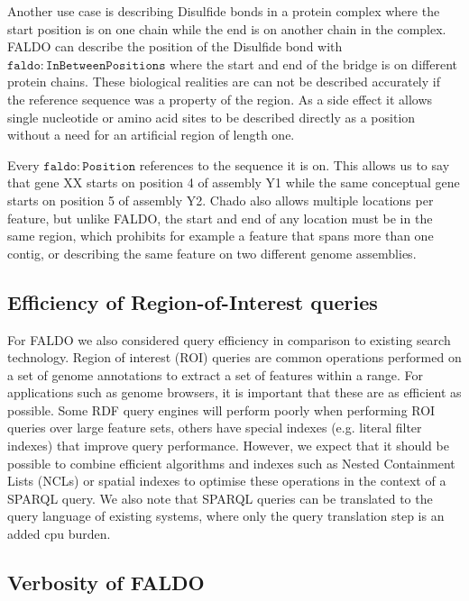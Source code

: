 Another use case is describing Disulfide bonds in a protein complex where the start position is on one chain while the end is on another chain in the complex. FALDO can describe the position of the Disulfide bond with $\mathtt{faldo\colon{}InBetweenPositions}$ where the start and end of the bridge is on different protein chains.
These biological realities are can not be described accurately if the reference sequence was a property of the region. 
As a side effect it allows single nucleotide or amino acid sites to be described directly as a position without a need for an artificial region of length one.

Every $\mathtt{faldo\colon{}Position}$ references to the sequence it is on. This allows us to say that gene XX starts on position 4 of assembly Y1 while the same conceptual gene starts on position 5 of assembly Y2. Chado also allows multiple locations per feature, but unlike FALDO, the start and end of
any location must be in the same region, which prohibits for example a feature that spans more than one contig, or describing the same feature on two different genome assemblies.

\subsection*{Efficiency of Region-of-Interest queries}

For FALDO we also considered query efficiency in comparison to existing search technology. 
Region of interest (ROI) queries are common operations performed on a
set of genome annotations to extract a set of features within a
range. For applications such as genome browsers, it is important that
these are as efficient as possible. Some RDF query engines will
perform poorly when performing ROI queries over large feature
sets, others have special indexes (e.g. literal filter indexes) 
that improve query performance. However, we expect that it should be possible to combine
efficient algorithms and indexes such as Nested Containment Lists
(NCLs)\cite{NCL2007} or spatial indexes to optimise these operations
in the context of a SPARQL query. We also note that SPARQL queries can
be translated to the query language of existing systems, where only 
the query translation step is an added cpu burden.

\subsection*{Verbosity of FALDO}

